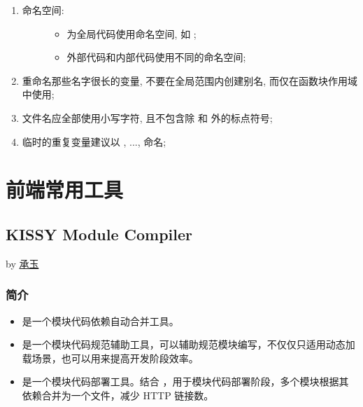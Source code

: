\documentclass[letterpaper,10pt,english]{sphinxmanual}
\begin{document}
\begin{enumerate}
\item {} \begin{description}
\item[{命名空间:}] \leavevmode\begin{itemize}
\item {}
为全局代码使用命名空间, 如 ;

\item {}
外部代码和内部代码使用不同的命名空间;

\end{itemize}

\end{description}

\item {}
重命名那些名字很长的变量, 不要在全局范围内创建别名, 而仅在函数块作用域中使用;

\item {}
文件名应全部使用小写字符, 且不包含除 \code{-} 和 \code{\_} 外的标点符号;

\item {}
临时的重复变量建议以 , ..., 命名;

\end{enumerate}


\chapter{前端常用工具}
\label{tools/index:tools}\label{tools/index::doc}\label{tools/index:id1}\label{tools/module-compiler/index:module-module-compiler}

\section{KISSY Module Compiler}
\label{tools/module-compiler/index:kissy-module-compiler}\label{tools/module-compiler/index::doc}
by \href{mailto:yiminghe@gmail.com}{承玉}


\subsection{简介}
\label{tools/module-compiler/intro::doc}\label{tools/module-compiler/intro:id1}\begin{itemize}
\item {}
是一个模块代码依赖自动合并工具。

\item {}
是一个模块代码规范辅助工具，可以辅助规范模块编写，不仅仅只适用动态加载场景，也可以用来提高开发阶段效率。

\item {}
是一个模块代码部署工具。结合 {\hyperref[api/seed/loader/index:module-Loader]{}} ，用于模块代码部署阶段，多个模块根据其依赖合并为一个文件，减少 HTTP 链接数。

\end{itemize}
\end{document}
